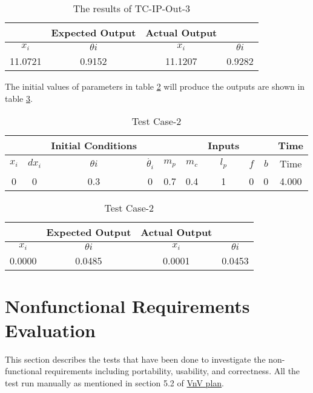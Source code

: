 \documentclass[12pt, titlepage]{article}
\begin{document}
\begin{table}[ht]
\caption{The results of TC-IP-Out-3} \label{out3_res3}
\vspace*{2mm}
\centering
 \begin{tabular}{|c c|c c|} 
 \hline
&\textbf{Expected Output}& \textbf{Actual Output} &  \\ \hline
$x_i$&$\theta{i}$ & $x_i$&$\theta{i}$  \\ \hline
  11.0721&  0.9152 &11.1207 &  0.9282 \\
 \hline
\end{tabular}
\end{table}	

The initial values of parameters in table \ref{out4} will produce the outputs are shown in table \ref{out4_res4}.
\begin{table}[ht]
\caption{Test Case-2} \label{out4}
\vspace*{2mm}
\centering
 \begin{tabular}{|c c c c|c c c c c|c|} 
 \hline
&&\textbf{Initial Conditions}& &  &  &  \textbf{Inputs} &  &&\textbf{Time}  \\ \hline
$x_i$&$dx_i$&$\theta{i}$&$\dot{\theta_{i}}$ & $m_p$ & $m_c$ & $l_p$ & $f$ & $b$  & Time \\ \hline
0 & 0 & 0.3 & 0 & 0.7 & 0.4 & 1 & 0 & 0 & 4.000\\
 \hline
\end{tabular}
\end{table}	

\begin{table}[ht]
\caption{Test Case-2} \label{out4_res4}
\vspace*{2mm}
\centering
 \begin{tabular}{|c c|c c|} 
 \hline
&\textbf{Expected Output}& \textbf{Actual Output} &  \\ \hline
$x_i$&$\theta{i}$ & $x_i$&$\theta{i}$  \\ \hline
0.0000&0.0485&0.0001& 0.0453\\
 \hline
\end{tabular}
\end{table}	




\section{Nonfunctional Requirements Evaluation}\label{nonFunR}
This section describes the tests that have been done to investigate the non-functional requirements including portability, usability, and correctness. All the test run manually as mentioned in section 5.2 of  \href{https://github.com/MinMah23/CAS741-Project/tree/main/docs/VnVPlan}{VnV plan}.
\end{document}
